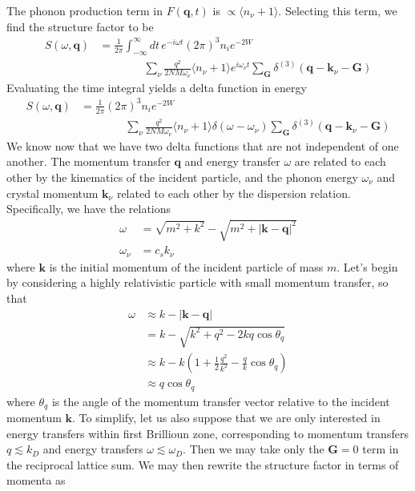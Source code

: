 \documentclass{article}
\begin{document}
The phonon production term in $F(\textbf{q}, t)$ is $ \propto \langle n_\nu + 1 \rangle$. Selecting this term, we find the structure factor to be
\begin{align}
S(\omega, \textbf{q}) &= \frac{1}{2 \pi} \int_{-\infty}^\infty dt \, e^{-i \omega t} (2 \pi)^3 n_i e^{-2 W}  \nonumber\\
 &\qquad\qquad  \sum_\nu\frac{q^2}{2 NM \omega_\nu} \langle n_\nu + 1 \rangle e^{i \omega_\nu t} \sum_\textbf{G} \delta^{(3)}(\textbf{q} - \textbf{k}_\nu - \textbf{G})
\end{align}
Evaluating the time integral yields a delta function in energy
\begin{align}
S(\omega, \textbf{q}) &= \frac{1}{2 \pi} (2 \pi)^3 n_i e^{-2 W}  \nonumber\\
&\qquad\qquad  \sum_\nu\frac{q^2}{2 NM \omega_\nu} \langle n_\nu + 1 \rangle \delta(\omega - \omega_\nu) \sum_\textbf{G} \delta^{(3)}(\textbf{q} - \textbf{k}_\nu - \textbf{G})
\end{align}
We know now that we have two delta functions that are not independent of one another. The momentum transfer $\textbf{q}$ and energy transfer $\omega$ are related to each other by the kinematics of the incident particle, and the phonon energy $\omega_\nu$ and crystal momentum $\textbf{k}_\nu$ related to each other by the dispersion relation. Specifically, we have the relations
\begin{align}
\omega &= \sqrt{m^2 + k^2} - \sqrt{m^2 + |\textbf{k} - \textbf{q}|^2} \\
\omega_\nu &= c_sk_\nu
\end{align}
where $\textbf{k}$ is the initial momentum of the incident particle of mass $m$. Let's begin by considering a highly relativistic particle with small momentum transfer, so that
\begin{align}
\omega &\approx k - |\textbf{k} - \textbf{q}| \\
   &= k - \sqrt{k^2 + q^2 - 2 kq\cos\theta_{q}} \\
   &\approx k - k \left( 1 + \frac12 \frac{q^2}{k^2} - \frac{q}{k}\cos\theta_{q} \right) \\
   &\approx q\cos\theta_{q} \label{eq:EnergyMomentumRelation}
\end{align}
where $\theta_q$ is the angle of the momentum transfer vector relative to the incident momentum $\textbf{k}$.
To simplify, let us also suppose that we are only interested in energy transfers within first Brillioun zone, corresponding to momentum transfers $q\lesssim k_D$ and energy transfers $\omega \lesssim \omega_D$. Then we may take only the $\textbf{G} = 0$ term in the reciprocal lattice sum. We may then rewrite the structure factor in terms of momenta as
\end{document}

